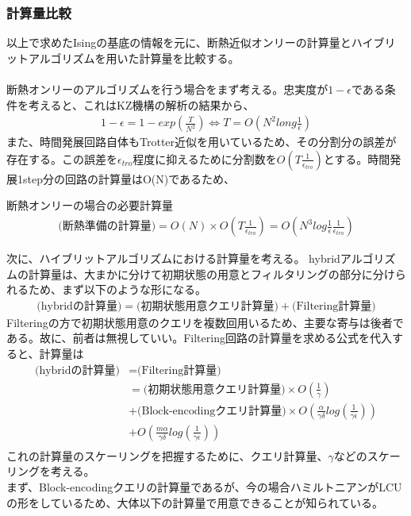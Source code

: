 \documentclass[a4paper,10.5pt]{article}
\numberwithin{equation}{section}
\begin{document}
\begin{enumerate}
\subsubsection{計算量比較}
以上で求めたIsingの基底の情報を元に、断熱近似オンリーの計算量とハイブリットアルゴリズムを用いた計算量を比較する。\\
\\
断熱オンリーのアルゴリズムを行う場合をまず考える。忠実度が$1-\epsilon$である条件を考えると、これはKZ機構の解析の結果から、
\begin{align*}
    1-\epsilon = 1- exp (\frac{T}{N^{2}}) \iff T=O(N^{2}long\frac{1}{\epsilon})
\end{align*}
また、時間発展回路自体もTrotter近似を用いているため、その分割分の誤差が存在する。この誤差を$\epsilon_{tro}$程度に抑えるために分割数を$O(T\frac{1}{\epsilon_{tro}})$とする。時間発展1step分の回路の計算量はO(N)であるため、
\begin{resultbox}{断熱オンリーの場合の必要計算量}
\begin{align*}
    \text{(断熱準備の計算量)}=O(N)\times O(T\frac{1}{\epsilon_{tro}})=O(N^{3}log\frac{1}{\epsilon}\frac{1}{\epsilon_{tro}})
\end{align*}
\end{resultbox}
次に、ハイブリットアルゴリズムにおける計算量を考える。
hybridアルゴリズムの計算量は、大まかに分けて初期状態の用意とフィルタリングの部分に分けられるため、まず以下のような形になる。
\begin{align*}
    \text{(hybridの計算量)}=\text{(初期状態用意クエリ計算量)}+\text{(Filtering計算量)}
\end{align*}
Filteringの方で初期状態用意のクエリを複数回用いるため、主要な寄与は後者である。故に、前者は無視していい。Filtering回路の計算量を求める公式を代入すると、計算量は
\begin{align*}
    \text{(hybridの計算量)}
    &=\text{(Filtering計算量)}\\
    &=\text{(初期状態用意クエリ計算量)}\times O(\frac{1}{\gamma})\\
    &+\text{(Block-encodingクエリ計算量)}\times O(\frac{\alpha}{\gamma\delta}log(\frac{1}{\gamma\epsilon}))\\
    &+O(\frac{m\alpha}{\gamma\delta}log(\frac{1}{\gamma\epsilon}))\\
\end{align*}
これの計算量のスケーリングを把握するために、クエリ計算量、$\gamma$などのスケーリングを考える。\\
まず、Block-encodingクエリの計算量であるが、今の場合ハミルトニアンがLCUの形をしているため、大体以下の計算量で用意できることが知られている。\\

\end{enumerate}
\end{document}

